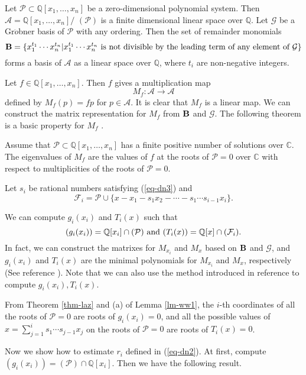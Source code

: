 \documentclass[amsthm]{JSC_LaTex_2007_Mar_12/elsart}
\def\bref#1{(\ref{#1})}
\def\C{{\mathbb{C}}}
\def\Q{{\mathbb{Q}}}
\def\B{{\bf B}}
\def\PS{ {\mathcal{P}} }
\def\GB{{\mathcal{G}}}
\begin{document}
Let $\PS\subset\Q[x_1,\ldots,x_n]$ be a zero-dimensional polynomial
system. Then $\mathcal{A}=\mathbb{Q}[x_1,\ldots,x_n]/$ $(\PS)$ is a
finite dimensional linear space over $\Q$. Let $\GB$ be a
Gr$\ddot{o}$bner basis of $\PS$ with any ordering. Then the set of
remainder monomials
$$\B=\{x_1^{t_1}\cdots x_n^{t_n}|x_1^{t_1}\cdots x_n^{t_n} \hbox{ is not divisible by the leading term of any element of } \GB\}$$
forms a basis of $\mathcal{A}$ as a linear space over $\Q$, where
$t_i$ are non-negative integers.

Let $f\in\Q[x_1,\ldots,x_n]$. Then $f$ gives a multiplication map
$$M_f: \mathcal{A}\longrightarrow \mathcal{A}$$
defined by $M_f(p)=f p$ for $p\in \mathcal{A}$.
It is clear that $M_f$ is a linear map. We can construct the matrix
representation for $M_f$ from  $\B$ and $\GB$. The following theorem
is a basic property for $M_f$ \cite{lazard1}.

\begin{thm}\label{thm-laz}
Assume that $\PS\subset\Q[x_1,\ldots,x_n]$ has a finite positive
number of solutions over $\C$. The eigenvalues of $M_f$ are the
values of $f$ at the roots of $\PS=0$ over $\C$ with respect to
multiplicities of the roots of $\PS=0$.
\end{thm}


Let $s_i$ be rational numbers satisfying \bref{eq-dn3} and
$${\mathcal{F}_i} = \PS\cup\{x - x_1 - s_1 x_2 - \cdots - s_1\cdots
s_{i-1} x_i\}.$$

We can compute $g_i(x_i)$ and $T_i(x)$ such that
\begin{equation}\label{eq-ti}
(g_i(x_i))=\Q[x_i]\cap(\PS) \hbox{ and }
(T_i(x))=\Q[x]\cap(\mathcal{F}_i).
\end{equation}
In fact, we can construct the matrixes for $M_{x_i}$ and $M_x$ based
on $\B$ and $\GB$, and $g_i(x_i)$ and $T_i(x)$ are the minimal
polynomials for $M_{x_i}$ and $M_x$, respectively  (See reference
\cite{cox}).
Note that we can also use the method introduced in reference
\cite{fglm} to compute $g_i(x_i), T_i(x)$.

From Theorem \ref{thm-laz} and (a) of Lemma \ref{lm-ww1},  the
$i$-th coordinates of all the roots of $\PS=0$ are roots of
$g_i(x_i)=0$, and all the possible values of $x=\sum_{j=1}^i
s_1\cdots s_{j-1} x_j$ on the roots of $\PS=0$ are roots of
$T_i(x)=0$.

Now we show how to estimate $r_{i}$ defined in \bref{eq-dn2}. At
first, compute $(g_{i}(x_{i}))=(\PS)\cap\Q[x_{i}]$. Then we have the
following result.
\end{document}
